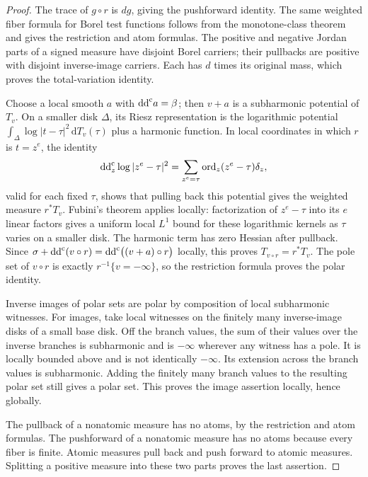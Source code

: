 \begin{proof}
The trace of $g\circ r$ is $dg$, giving the pushforward
identity. The same weighted fiber formula for Borel test
functions follows from the monotone-class theorem and gives
the restriction and atom formulas. The positive and negative
Jordan parts of a signed measure have disjoint Borel carriers;
their pullbacks are positive with disjoint inverse-image
carriers. Each has $d$ times its original mass, which proves
the total-variation identity.

Choose a local smooth $a$ with $\mathrm{dd}^{\mathrm{c}} a=\beta$; then $v+a$
is a subharmonic potential of $T_v$. On a smaller disk $\Delta$,
its Riesz representation is the logarithmic potential
$\int_\Delta\log|t-\tau|^2\,\mathrm dT_v(\tau)$ plus a harmonic
function. In local coordinates in which $r$ is $t=z^e$, the
identity
\[
 \mathrm{dd}^{\mathrm{c}}_z\log|z^e-\tau|^2
       =\sum_{z^e=\tau}\operatorname{ord}_z(z^e-\tau)\delta_z,
\]
valid for each fixed $\tau$, shows that pulling back this
potential gives the weighted measure $r^*T_v$. Fubini's theorem
applies locally: factorization of $z^e-\tau$ into its $e$ linear
factors gives a uniform local $L^1$ bound for these logarithmic
kernels as $\tau$ varies on a smaller disk. The harmonic term
has zero Hessian after pullback. Since
$\sigma+\mathrm{dd}^{\mathrm{c}}(v\circ r)=\mathrm{dd}^{\mathrm{c}}\bigl((v+a)\circ r\bigr)$ locally, this
proves $T_{v\circ r}=r^*T_v$.
The pole set of $v\circ r$ is exactly $r^{-1}\{v=-\infty\}$,
so the restriction formula proves the polar identity.

Inverse images of polar sets are polar by composition of
local subharmonic witnesses. For images, take local witnesses
on the finitely many inverse-image disks of a small base disk.
Off the branch values, the sum of their values over the inverse
branches is subharmonic and is $-\infty$ wherever any witness
has a pole. It is locally bounded above and is not identically
$-\infty$. Its extension across the branch values is
subharmonic. Adding the finitely many branch values to the
resulting polar set still gives a polar set. This proves the
image assertion locally, hence globally.

The pullback of a nonatomic measure has no atoms, by the
restriction and atom formulas. The pushforward of a nonatomic
measure has no atoms because every fiber is finite. Atomic measures pull back and
push forward to atomic measures. Splitting a positive measure
into these two parts proves the last assertion.
\end{proof}
